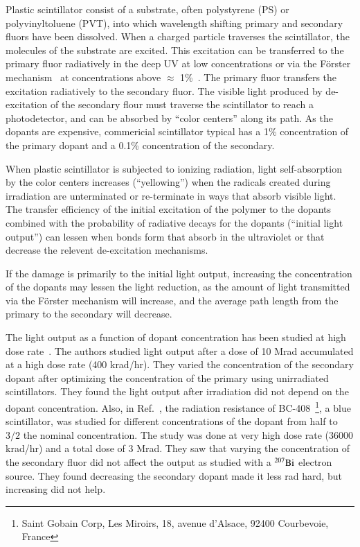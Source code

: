 \documentclass[review]{elsarticle}
\begin{document}
Plastic scintillator consist of a substrate, 
often polystyrene (PS) or polyvinyltoluene (PVT),
into which wavelength 
shifting primary and secondary fluors have been dissolved.
When a charged particle traverses the scintillator, the molecules of the substrate are excited.  
This excitation can be transferred to the primary fluor radiatively 
in the deep UV at low concentrations or 
via the F{\"o}rster mechanism~\cite{forster} at concentrations above $\approx$ 1\%~\cite{birks}.  
The primary fluor transfers the excitation radiatively to the secondary fluor.  
The visible light produced by de-excitation of the secondary flour
must traverse the scintillator to reach a photodetector, 
and can be absorbed by ``color centers'' along its path.
As the dopants are expensive, commericial scintillator typical has a 1\% concentration of the
primary dopant and a 0.1\% concentration of the secondary.

When plastic scintillator is subjected to ionizing radiation,
light self-absorption by the color centers  increases (``yellowing'') when the 
radicals created during irradiation are unterminated or 
re-terminate in ways that absorb visible light.
The transfer efficiency of the initial excitation of the polymer to the
dopants combined with the probability of 
radiative decays for the dopants (``initial light output'') can lessen
when bonds form that absorb in the ultraviolet or 
that decrease the relevent de-excitation mechanisms.

If the damage is primarily to the initial light output, increasing the concentration 
of the dopants may lessen the light reduction, as the amount of light transmitted
via the F{\"o}rster mechanism will increase, and the average path length from the primary to the
secondary will decrease.

The light output as a function of dopant concentration has been studied
at high dose rate~\cite{Bross199135}.  The authors studied light output
after a dose of 10 Mrad accumulated at a high dose rate (400 krad/hr).
They varied the concentration of the secondary dopant after optimizing the
concentration of the primary using unirradiated scintillators.  They found
the light output after irradiation did not depend on the dopant concentration.
Also, in Ref.~\cite{Majewski1989500}, the radiation resistance of 
BC-408~\footnote{Saint Gobain Corp, Les Miroirs, 18, avenue d'Alsace, 92400 Courbevoie, France},
a blue scintillator,
was studied for different concentrations of the dopant from half to $3/2$ 
the nominal concentration.  The study was done at very high dose rate 
(36000 krad/hr) and a total dose of 3 Mrad.  
They saw that varying the concentration of the secondary fluor 
did not affect the output as studied with a $\rm{^{207}Bi}$ electron source.  
They found decreasing the secondary dopant made it less rad hard, but increasing did not help.  
\end{document}
